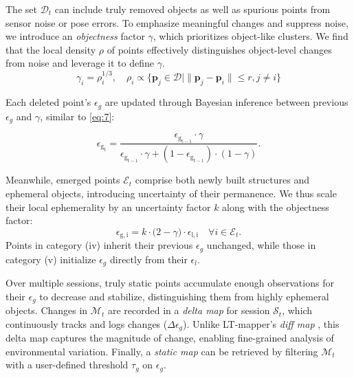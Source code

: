 The set \(\mathcal{D}_t\) can include truly removed objects as well as spurious points from sensor noise or pose errors.  
To emphasize meaningful changes and suppress noise, we introduce an \emph{objectness} factor $\gamma$, which prioritizes object-like clusters.  
We find that the local density $\rho$ of points effectively distinguishes object-level changes from noise and leverage it to define $\gamma$.
\begin{equation}
\gamma_i = \rho_i^{1/3}, \quad \rho_i \propto \{ \mathbf{p}_j \in \mathcal{D} \mid \|\mathbf{p}_j - \mathbf{p}_i\| \leq r, j \neq i \} 
\label{eq:8}
\end{equation}


Each deleted point’s $\epsilon_{g}$ are updated through Bayesian inference between previous $\epsilon_{g}$ and $\gamma$, similar to \eqref{eq:7}:

\begin{equation}
\epsilon_{\mathrm{g_t}} = 
\frac{\epsilon_{\mathrm{g_{t-1}}} \cdot \gamma}
{\epsilon_{\mathrm{g_{t-1}}} \cdot \gamma + (1 - \epsilon_{\mathrm{g_{t-1}}}) \cdot (1 - \gamma)}.
\label{eq:9}
\end{equation}

Meanwhile, emerged points \(\mathcal{E}_t\) comprise both newly built structures and ephemeral objects, introducing uncertainty of their permanence.
We thus scale their local ephemerality by an uncertainty factor \(k\) along with the objectness factor:
\begin{equation}
    \epsilon_{\mathrm{g,i}} = k \cdot \bigl(2-\gamma\bigr) \cdot  \epsilon_{\mathrm{l,i}} \quad \forall i \in \mathcal{E}_t.
    \label{eq:10}
\end{equation}
Points in category (iv) inherit their previous $\epsilon_g$ unchanged, while those in category (v) initialize $\epsilon_g$ directly from their $\epsilon_l$.

Over multiple sessions, truly static points accumulate enough observations for their $\epsilon_g$ to decrease and stabilize, distinguishing them from highly ephemeral objects.  
Changes in $\mathcal{M}_{t}$ are recorded in a \emph{delta map} for session $\mathcal{S}_t$, which continuously tracks and logs changes (\(\Delta \epsilon_g\)).  
Unlike LT-mapper’s \emph{diff map} \cite{kim2022lt}, this delta map captures the magnitude of change, enabling fine-grained analysis of environmental variation.  
Finally, a \emph{static map} can be retrieved by filtering $\mathcal{M}_t$ with a user-defined threshold \(\tau_g\) on $\epsilon_g$.

